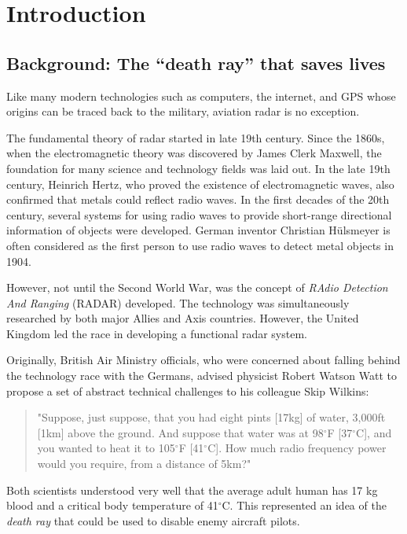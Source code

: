 \chapter{Introduction} \label{chap:intro}

\section{Background: The ``death ray'' that saves lives}

Like many modern technologies such as computers, the internet, and GPS whose origins can be traced back to the military, aviation radar is no exception. 

The fundamental theory of radar started in late 19th century. Since the 1860s, when the electromagnetic theory was discovered by James Clerk Maxwell, the foundation for many science and technology fields was laid out. In the late 19th century, Heinrich Hertz, who proved the existence of electromagnetic waves, also confirmed that metals could reflect radio waves. In the first decades of the 20th century, several systems for using radio waves to provide short-range directional information of objects were developed. German inventor 
Christian H\"ulsmeyer is often considered as the first person to use radio waves to detect metal objects in 1904.

However, not until the Second World War, was the concept of \emph{RAdio Detection And Ranging} (RADAR) developed. The technology was simultaneously researched by both major Allies and Axis countries. However, the United Kingdom led the race in developing a functional radar system. 

Originally, British Air Ministry officials, who were concerned about falling behind the technology race with the Germans, advised physicist Robert Watson Watt to propose a set of abstract technical challenges to his colleague Skip Wilkins:

\begin{quotation}
\noindent"Suppose, just suppose, that you had eight pints [17kg] of water, 3,000ft [1km] above the ground. And suppose that water was at 98$^\circ$F [37$^\circ$C], and you wanted to heat it to 105$^\circ$F [41$^\circ$C]. How much radio frequency power would you require, from a distance of 5km?"
\end{quotation}

Both scientists understood very well that the average adult human has 17 kg blood and a critical body temperature of 41$^\circ$C. This represented an idea of the \emph{death ray} that could be used to disable enemy aircraft pilots.

